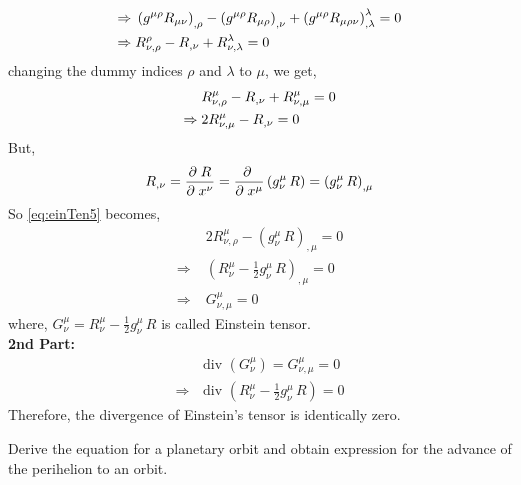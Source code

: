 \documentclass[../main-sheet.tex]{subfiles}
\begin{document}
\begin{soln}
\begin{align*}
                \Rightarrow\;&\left(g^{\mu \rho} R_{{\mu\nu}}\right)_{,\rho} - \left(g^{\mu \rho}R_{\mu \rho}\right)_{ ,\nu}+\left(g^{\mu \rho}R_{\mu \rho \nu}\right)_{ ,\lambda}^\lambda=0\\
                \Rightarrow\;&R_{\nu,\rho}^{\rho} - R_{ ,\nu}+R_{\nu,\lambda}^\lambda=0
            \end{align*}
            changing the dummy indices \(\rho\) and \(\lambda\) to \(\mu\), we get,
            \begin{align}
                &R_{\nu,\rho}^{\mu} - R_{ ,\nu}+R_{\nu,\mu}^\mu=0\notag\\
                \Rightarrow\;&2R_{\nu,\mu}^{\mu} - R_{ ,\nu}=0\label{eq:einTen5}
            \end{align}
            But,
            \[
                R_{,\nu}=\frac{\partial\;R}{\partial\; x^\nu}=\frac{\partial\;}{\partial\; x^\mu}\left( g^\mu_\nu\,R \right)=\left( g^\mu_\nu\,R \right)_{,\mu}
                \]
                So \eqref{eq:einTen5} becomes,
                \begin{align*}
                    &2R_{\nu,\rho}^{\mu} - \left( g^\mu_\nu\,R \right)_{,\mu}=0\\
                    \Rightarrow\;&\left(R_{\nu}^{\mu} - \frac{1}{2} g^\mu_\nu\,R \right)_{,\mu}=0\\
                    \Rightarrow\;&G_{\nu,\mu}^\mu=0
            \end{align*}
            where, \(G_{\nu}^\mu=R_{\nu}^{\mu} - \frac{1}{2} g^\mu_\nu\,R\) is called Einstein tensor.\\


            \textbf{2nd Part:}
            \begin{align*}
                & \text{div }\left( G_{\nu}^\mu \right)=G_{\nu,\mu}^\mu=0\\
                \Rightarrow\,& \text{div }\left( R_{\nu}^{\mu} - \frac{1}{2} g^\mu_\nu\,R \right)=0
            \end{align*}
            Therefore, the divergence of Einstein's tensor is identically zero.
    \end{soln}
    \begin{prob}
        Derive the equation for a planetary orbit and obtain expression for the advance of the perihelion to an orbit.
    \end{prob}
\end{document}

